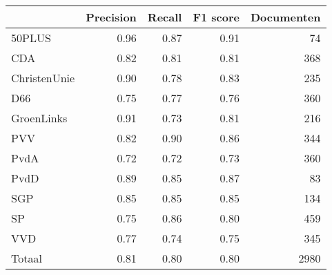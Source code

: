 \begin{tabular}{lrrrr}
\toprule
{} &  Precision &  Recall &  F1 score &  Documenten \\
\midrule
50PLUS       &       0.96 &    0.87 &      0.91 &          74 \\
CDA          &       0.82 &    0.81 &      0.81 &         368 \\
ChristenUnie &       0.90 &    0.78 &      0.83 &         235 \\
D66          &       0.75 &    0.77 &      0.76 &         360 \\
GroenLinks   &       0.91 &    0.73 &      0.81 &         216 \\
PVV          &       0.82 &    0.90 &      0.86 &         344 \\
PvdA         &       0.72 &    0.72 &      0.73 &         360 \\
PvdD         &       0.89 &    0.85 &      0.87 &          83 \\
SGP          &       0.85 &    0.85 &      0.85 &         134 \\
SP           &       0.75 &    0.86 &      0.80 &         459 \\
VVD          &       0.77 &    0.74 &      0.75 &         345 \\
Totaal       &       0.81 &    0.80 &      0.80 &        2980 \\
\bottomrule
\end{tabular}
